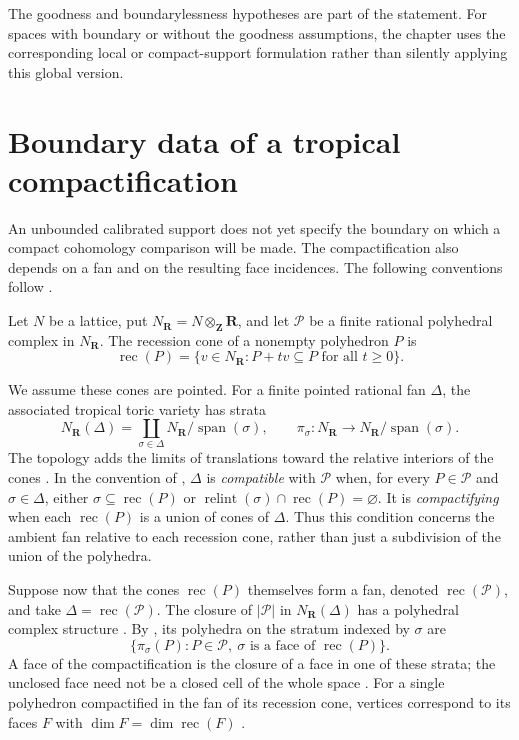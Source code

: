 The goodness and boundarylessness hypotheses are part of the statement.
For spaces with boundary or without the goodness assumptions, the chapter
uses the corresponding local or compact-support formulation rather than
silently applying this global version.

\section{Boundary data of a tropical compactification}
\label{sec:appG-tropical-compactification}

An unbounded calibrated support does not yet specify the boundary on
which a compact cohomology comparison will be made. The compactification
also depends on a fan and on the resulting face incidences. The following
conventions follow \cite{KSW25Compactification}.

\begin{samepage}
Let $N$ be a lattice, put $N_{\mathbf R}=N\otimes_{\mathbf Z}\mathbf R$, and let
$\mathcal P$ be a finite rational polyhedral complex in $N_{\mathbf R}$.
The recession cone of a nonempty polyhedron $P$ is
\[
 \operatorname{rec}(P)
   =\{v\in N_{\mathbf R}:P+tv\subseteq P\text{ for all }t\ge0\}.
\]
\end{samepage}
We assume these cones are pointed. For a finite pointed rational fan $\Delta$,
the associated tropical toric variety has strata
\[
 N_{\mathbf R}(\Delta)
    =\coprod_{\sigma\in\Delta}
       N_{\mathbf R}/\operatorname{span}(\sigma),
 \qquad
 \pi_\sigma:N_{\mathbf R}\longrightarrow
       N_{\mathbf R}/\operatorname{span}(\sigma).
\]
The topology adds the limits of translations toward the relative
interiors of the cones \cite[Definition~2.1]{KSW25Compactification}.
In the convention of \cite[Definition~2.2]{KSW25Compactification},
$\Delta$ is \emph{compatible} with $\mathcal P$ when, for every
$P\in\mathcal P$ and $\sigma\in\Delta$, either
$\sigma\subseteq\operatorname{rec}(P)$ or
$\operatorname{relint}(\sigma)\cap\operatorname{rec}(P)=\varnothing$.
It is \emph{compactifying} when each $\operatorname{rec}(P)$ is a
union of cones of $\Delta$. Thus this condition concerns the ambient
fan relative to each recession cone, rather than just a subdivision
of the union of the polyhedra.

Suppose now that the cones $\operatorname{rec}(P)$ themselves form a
fan, denoted $\operatorname{rec}(\mathcal P)$, and take
$\Delta=\operatorname{rec}(\mathcal P)$. The closure of
$|\mathcal P|$ in $N_{\mathbf R}(\Delta)$ has a polyhedral complex
structure \cite[Theorem~3.32]{KSW25Compactification}. By
\cite[Lemma~3.31]{KSW25Compactification}, its polyhedra on the stratum
indexed by $\sigma$ are
\[
 \{\pi_\sigma(P):P\in\mathcal P,
                  \ \sigma\text{ is a face of }\operatorname{rec}(P)\}.
\]
A face of the compactification is the closure of a face in one of
these strata; the unclosed face need not be a closed cell of the whole
space \cite[Definitions~3.1 and~3.8]{KSW25Compactification}.
For a single polyhedron compactified in the fan of its recession cone,
vertices correspond to its faces $F$ with
$\dim F=\dim\operatorname{rec}(F)$
\cite[Propositions~3.24 and~3.25]{KSW25Compactification}.

